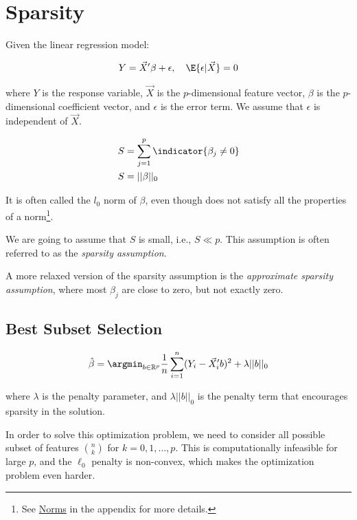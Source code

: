 \section{Sparsity}

Given the linear regression model: 

\begin{align*}
    Y = \Vec{X}'\beta + \epsilon, \quad \E{\epsilon | \Vec{X}} = 0 
\end{align*}

where $Y$ is the response variable, $\Vec{X}$ is the $p$-dimensional feature vector, $\beta$ is the $p$-dimensional coefficient vector, and $\epsilon$ is the error term. We assume that $\epsilon$ is independent of $\Vec{X}$.

\begin{def*}
\begin{align*}
S &= \sum_{j=1}^p \indicator{\beta_j \neq 0} \\
S &= ||\beta||_0
\end{align*}

It is often called the $l_0$ norm of $\beta$, even though does not satisfy all the properties of a norm\footnote{See \hyperref[sec:norms]{Norms} in the appendix for more details.}.
\end{def*}

\begin{myanswerbox}
We are going to assume that $S$ is small, i.e., $S \ll p$. This assumption is often referred to as the \textit{sparsity assumption}.
\end{myanswerbox}

A more relaxed version of the sparsity assumption is the \emph{approximate sparsity assumption}, where most $\beta_j$ are close to zero, but not exactly zero.

\subsection{Best Subset Selection}

\begin{align*}
\hat{\beta} = \argmin_{b \in \mathbb{R}^p} 
\frac{1}{n} \sum_{i=1}^n (Y_i - \Vec{X}_i'b)^2 + \lambda ||b||_0
\end{align*}

where $\lambda$ is the penalty parameter, and $\lambda ||b||_0$ is the penalty term that encourages sparsity in the solution.

In order to solve this optimization problem, we need to consider all possible subset of features $n \choose k$ for $k = 0, 1, \ldots, p$. This is computationally infeasible for large $p$, and the $\ell_0$ penalty is non-convex, which makes the optimization problem even harder.


